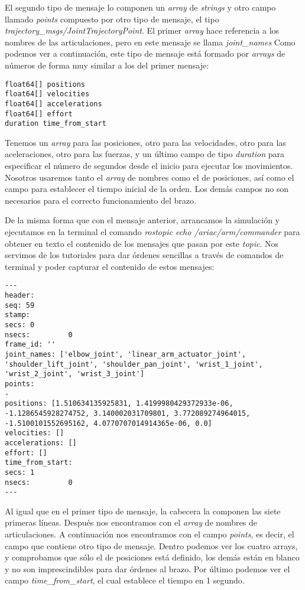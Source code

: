 El segundo tipo de mensaje lo componen un \textit{array} de \textit{strings} y otro campo llamado \textit{points} compuesto por otro tipo de mensaje, el tipo \textit{trajectory\_msgs/JointTrajectoryPoint}. El primer \textit{array} hace referencia a los nombres de las articulaciones, pero en este mensaje se llama \textit{joint\_names} Como podemos ver a continuación, este tipo de mensaje está formado por \textit{arrays} de números de forma muy similar a los del primer mensaje:
\begin{lstlisting}
float64[] positions
float64[] velocities
float64[] accelerations
float64[] effort
duration time_from_start
\end{lstlisting}
Tenemos un \textit{array} para las posiciones, otro para las velocidades, otro para las aceleraciones, otro para las fuerzas, y un último campo de tipo \textit{duration} para especificar el número de segundos desde el inicio para ejecutar los movimientos. Nosotros usaremos tanto el \textit{array} de nombres como el de posiciones, así como el campo para establecer el tiempo inicial de la orden. Los demás campos no son necesarios para el correcto funcionamiento del brazo.

De la misma forma que con el mensaje anterior, arrancamos la simulación y ejecutamos en la terminal el comando \textit{rostopic echo /ariac/arm/commander} para obtener en texto el contenido de los mensajes que pasan por este \textit{topic}. Nos servimos de los tutoriales para dar órdenes sencillas a través de comandos de terminal y poder capturar el contenido de estos mensajes:
\begin{lstlisting}
---
header: 
seq: 59
stamp: 
secs: 0
nsecs:         0
frame_id: ''
joint_names: ['elbow_joint', 'linear_arm_actuator_joint', 'shoulder_lift_joint', 'shoulder_pan_joint', 'wrist_1_joint', 'wrist_2_joint', 'wrist_3_joint']
points: 
- 
positions: [1.510634135925831, 1.4199980429372933e-06, -1.1286545928274752, 3.140002031709801, 3.772089274964015, -1.5100101552695162, 4.0770707014914365e-06, 0.0]
velocities: []
accelerations: []
effort: []
time_from_start: 
secs: 1
nsecs:         0
---
\end{lstlisting}
Al igual que en el primer tipo de mensaje, la cabecera la componen las siete primeras líneas. Después nos encontramos con el \textit{array} de nombres de articulaciones. A continuación nos encontramos con el campo \textit{points}, es decir, el campo que contiene otro tipo de mensaje. Dentro podemos ver los cuatro arrays, y comprobamos que sólo el de posiciones está definido, los demás están en blanco y no son imprescindibles para dar órdenes al brazo. Por último podemos ver el campo \textit{time\_from\_start}, el cual establece el tiempo en 1 segundo.


